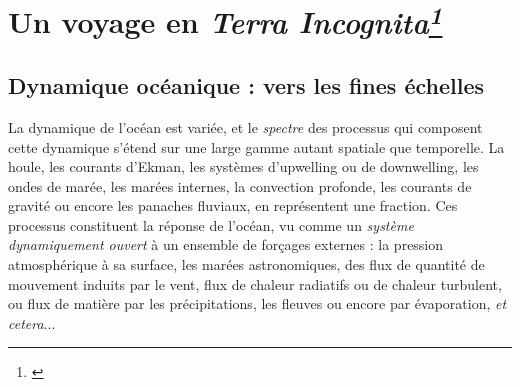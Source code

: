 


\section[Un voyage en \textit{Terra Incognita}]{Un voyage en \textit{Terra Incognita\footnote{\cite{scotti_large_2010}}}}
\subsection{Dynamique océanique : vers les fines échelles}
\label{subsection_intro1}



La dynamique de l'océan est variée, et le \textit{spectre} des processus qui composent cette dynamique s'étend sur une large gamme autant spatiale que temporelle. La houle, les courants d'Ekman, les systèmes d'upwelling ou de downwelling, les ondes de marée, les marées internes, la convection profonde, les courants de gravité ou encore les panaches fluviaux, en représentent une fraction. Ces processus constituent la réponse de l'océan, vu comme un \textit{système dynamiquement ouvert} à un ensemble de forçages externes : la pression atmosphérique à sa surface, les marées astronomiques, des flux de quantité de mouvement induits par le vent, flux de chaleur radiatifs ou de chaleur turbulent, ou flux de matière par les précipitations, les fleuves ou encore par évaporation, \textit{et cetera}...

